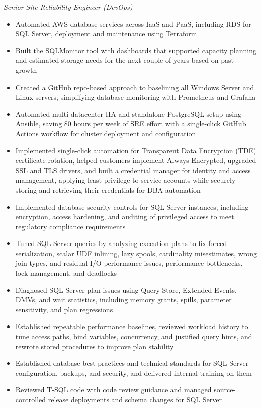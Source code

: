 \documentclass[10pt,a4paper]{article}
\begin{document}
\textit{Senior Site Reliability Engineer (DevOps)}\\[-5pt]
\begin{itemize}
  \item Automated AWS database services across IaaS and PaaS, including RDS for SQL Server, deployment and maintenance using Terraform
  \item Built the SQLMonitor tool with dashboards that supported capacity planning and estimated storage needs for the next couple of years based on past growth
  \item Created a GitHub repo-based approach to baselining all Windows Server and Linux servers, simplifying database monitoring with Prometheus and Grafana
  \item Automated multi-datacenter HA and standalone PostgreSQL setup using Ansible, saving 80 hours per week of SRE effort with a single-click GitHub Actions workflow for cluster deployment and configuration
  \item Implemented single-click automation for Transparent Data Encryption (TDE) certificate rotation, helped customers implement Always Encrypted, upgraded SSL and TLS drivers, and built a credential manager for identity and access management, applying least privilege to service accounts while securely storing and retrieving their credentials for DBA automation
  \item Implemented database security controls for SQL Server instances, including encryption, access hardening, and auditing of privileged access to meet regulatory compliance requirements
  \item Tuned SQL Server queries by analyzing execution plans to fix forced serialization, scalar UDF inlining, lazy spools, cardinality misestimates, wrong join types, and residual I/O performance issues, performance bottlenecks, lock management, and deadlocks
  \item Diagnosed SQL Server plan issues using Query Store, Extended Events, DMVs, and wait statistics, including memory grants, spills, parameter sensitivity, and plan regressions
  \item Established repeatable performance baselines, reviewed workload history to tune access paths, bind variables, concurrency, and justified query hints, and rewrote stored procedures to improve plan stability
  \item Established database best practices and technical standards for SQL Server configuration, backups, and security, and delivered internal training on them
  \item Reviewed T-SQL code with code review guidance and managed source-controlled release deployments and schema changes for SQL Server

\end{itemize}
\end{document}
